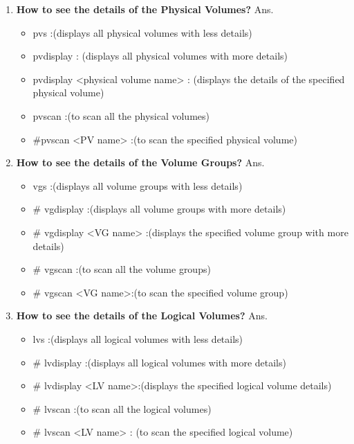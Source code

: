 \begin{enumerate}
\begin{enumerate}
    \item \textbf{How to see the details of the Physical Volumes?}
    \newline
    Ans.\begin{itemize}
           \item pvs :(displays all physical volumes with less details)
           \item  pvdisplay :	(displays  all physical volumes with more details)
           \item pvdisplay <physical volume name> :	(displays the details of the specified physical volume)
           \item pvscan	:(to scan all the physical volumes)
           \item #pvscan    <PV name>	:(to scan the specified physical volume)
        \end{itemize}

    \bigskip
    \bigskip

    \item \textbf{How to see the details of the Volume Groups?}
    \newline
    Ans.\begin{itemize}
          \item vgs	:(displays all volume groups with less details)
          \item# vgdisplay :(displays all volume groups with more details)
          \item # vgdisplay   <VG name>	:(displays the specified volume group with more details)
          \item# vgscan 	:(to scan all the volume groups)
          \item# vgscan    <VG name>:(to scan the specified volume group)
        \end{itemize}

    \bigskip
    \bigskip
    
    \item \textbf{How to see the details of the Logical Volumes?}
    \newline
    Ans.\begin{itemize}
           \item lvs :(displays all logical volumes with less details)
           \item # lvdisplay :(displays all logical volumes with more details)
           \item # lvdisplay   <LV name>:(displays the specified logical volume details)
           \item # lvscan	:(to scan all the logical volumes)
           \item # lvscan    <LV name>	: (to scan the specified logical volume)	
        \end{itemize}
    

\end{enumerate}
\end{enumerate}
